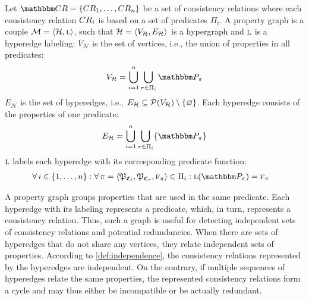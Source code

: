 \begin{definition} \label{def:propertygraph}
Let $\consistencyrelationset{CR} = \setted{\consistencyrelation{CR}{1}, \dots, \consistencyrelation{CR}{n}}$ be a set of consistency relations where each consistency relation $\consistencyrelation{CR}{i}$ is based on a set of predicates $\Pi_i$. 
A property graph is a couple $\mathcal{M}=\langle \mathcal{H}, \textsc{l} \rangle$, such that $\mathcal{H} = \langle V_{\mathcal{H}}, E_{\mathcal{H}} \rangle$ is a hypergraph and $\textsc{l}$ %
is a hyperedge labeling:
$V_{\mathcal{H}}$ is the set of vertices, i.e., the union of properties in all predicates:
\begin{align*}
    V_{\mathcal{H}} = \bigcup_{i = 1}^{n} \bigcup_{\pi \in \Pi_{i}} \propertycollection{\pi}
\end{align*}
$E_{\mathcal{H}}$ is the set of hyperedges, i.e., $E_{\mathcal{H}} \subseteq \mathcal{P}(V_{\mathcal{H}}) \setminus \{ \varnothing \}$. Each hyperedge consists of the properties of one predicate:
\begin{align*}
    E_{\mathcal{H}} = \bigcup_{i = 1}^{n} \bigcup_{\pi \in \Pi_{i}} \setted{\propertycollection{\pi}}
\end{align*}
$\textsc{l}$ labels each hyperedge with its corresponding predicate function:
\begin{align*}
    &\forall i \in \setted{1, \dots, n} : \forall \pi = \tupled{\propertysettuple{P}{\classtuple{C}{l}}, \propertysettuple{P}{\classtuple{C}{r}}, \function{f}_\pi} \in \Pi_{i} : %
    \function{l}(\propertycollection{\pi}) = \function{f}_\pi
\end{align*}
\end{definition}

A property graph groups properties that are used in the same predicate.
Each hyperedge with its labeling represents a predicate, which, in turn, represents a consistency relation.
Thus, such a graph is useful for detecting independent sets of consistency relations and potential redundancies.
When there are sets of hyperedges that do not share any vertices, they relate independent sets of properties.
According to \autoref{def:independence}, the consistency relations represented by the hyperedges are independent.
On the contrary, if multiple sequences of hyperedges relate the same properties, the represented consistency relations form a cycle and may thus either be incompatible or be actually redundant.

